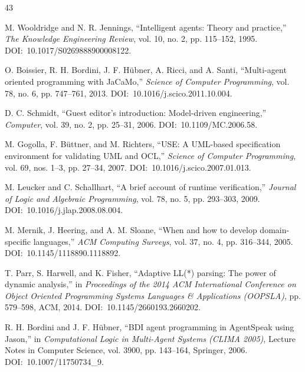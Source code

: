 \documentclass[12pt,a4paper,oneside]{extreport}
\begin{document}
\begin{thebibliography}{43}
\raggedright


M. Wooldridge and N. R. Jennings, ``Intelligent agents: Theory and practice,'' \emph{The Knowledge Engineering Review}, vol. 10, no. 2, pp. 115--152, 1995. \mbox{DOI: 10.1017/S0269888900008122}.


O. Boissier, R. H. Bordini, J. F. Hübner, A. Ricci, and A. Santi, ``Multi-agent oriented programming with JaCaMo,'' \emph{Science of Computer Programming}, vol. 78, no. 6, pp. 747--761, 2013. \mbox{DOI: 10.1016/j.scico.2011.10.004}.


D. C. Schmidt, ``Guest editor's introduction: Model-driven engineering,'' \emph{Computer}, vol. 39, no. 2, pp. 25--31, 2006. \mbox{DOI: 10.1109/MC.2006.58}.


M. Gogolla, F. Büttner, and M. Richters, ``USE: A UML-based specification environment for validating UML and OCL,'' \emph{Science of Computer Programming}, vol. 69, nos. 1--3, pp. 27--34, 2007. \mbox{DOI: 10.1016/j.scico.2007.01.013}.


M. Leucker and C. Schallhart, ``A brief account of runtime verification,'' \emph{Journal of Logic and Algebraic Programming}, vol. 78, no. 5, pp. 293--303, 2009. \mbox{DOI: 10.1016/j.jlap.2008.08.004}.


M. Mernik, J. Heering, and A. M. Sloane, ``When and how to develop domain-specific languages,'' \emph{ACM Computing Surveys}, vol. 37, no. 4, pp. 316--344, 2005. \mbox{DOI: 10.1145/1118890.1118892}.


T. Parr, S. Harwell, and K. Fisher, ``Adaptive LL(*) parsing: The power of dynamic analysis,'' in \emph{Proceedings of the 2014 ACM International Conference on Object Oriented Programming Systems Languages \& Applications (OOPSLA)}, pp. 579--598, ACM, 2014. \mbox{DOI: 10.1145/2660193.2660202}.


R. H. Bordini and J. F. Hübner, ``BDI agent programming in AgentSpeak using Jason,'' in \emph{Computational Logic in Multi-Agent Systems (CLIMA 2005)}, Lecture Notes in Computer Science, vol. 3900, pp. 143--164, Springer, 2006. \mbox{DOI: 10.1007/11750734\_9}.


\end{thebibliography}
\end{document}
